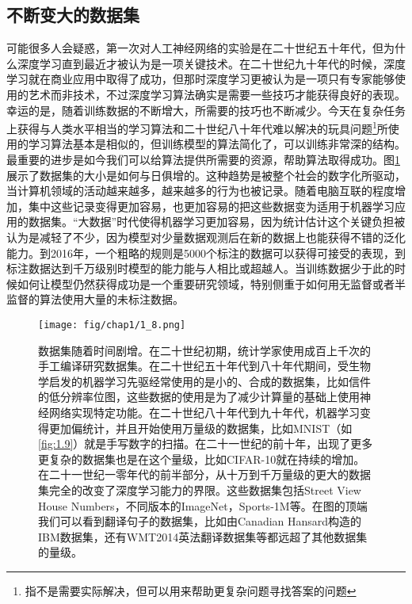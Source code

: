 \subsection{不断变大的数据集}
\label{sec:1.2.2}


可能很多人会疑惑，第一次对人工神经网络的实验是在二十世纪五十年代，但为什么深度学习直到最近才被认为是一项关键技术。在二十世纪九十年代的时候，深度学习就在商业应用中取得了成功，但那时深度学习更被认为是一项只有专家能够使用的艺术而非技术，不过深度学习算法确实是需要一些技巧才能获得良好的表现。幸运的是，随着训练数据的不断增大，所需要的技巧也不断减少。今天在复杂任务上获得与人类水平相当的学习算法和二十世纪八十年代难以解决的玩具问题\footnote{指不是需要实际解决，但可以用来帮助更复杂问题寻找答案的问题}所使用的学习算法基本是相似的，但训练模型的算法简化了，可以训练非常深的结构。最重要的进步是如今我们可以给算法提供所需要的资源，帮助算法取得成功。图\ref{fig:1.8}展示了数据集的大小是如何与日俱增的。这种趋势是被整个社会的数字化所驱动，当计算机领域的活动越来越多，越来越多的行为也被记录。随着电脑互联的程度增加，集中这些记录变得更加容易，也更加容易的把这些数据变为适用于机器学习应用的数据集。“大数据”时代使得机器学习更加容易，因为统计估计这个关键负担被认为是减轻了不少，因为模型对少量数据观测后在新的数据上也能获得不错的泛化能力。到2016年，一个粗略的规则是5000个标注的数据可以获得可接受的表现，到标注数据达到千万级别时模型的能力能与人相比或超越人。当训练数据少于此的时候如何让模型仍然获得成功是一个重要研究领域，特别侧重于如何用无监督或者半监督的算法使用大量的未标注数据。

\begin{figure}[htbp] %
   \centering
   \texttt{[image: fig/chap1/1\_8.png]} 
   \caption{数据集随着时间剧增。在二十世纪初期，统计学家使用成百上千次的手工编译研究数据集。在二十世纪五十年代到八十年代期间，受生物学启发的机器学习先驱经常使用的是小的、合成的数据集，比如信件的低分辨率位图，这些数据的使用是为了减少计算量的基础上使用神经网络实现特定功能。在二十世纪八十年代到九十年代，机器学习变得更加偏统计，并且开始使用万量级的数据集，比如MNIST（如\ref{fig:1.9}）就是手写数字的扫描。在二十一世纪的前十年，出现了更多更复杂的数据集也是在这个量级，比如CIFAR-10就在持续的增加。在二十一世纪一零年代的前半部分，从十万到千万量级的更大的数据集完全的改变了深度学习能力的界限。这些数据集包括Street View House Numbers，不同版本的ImageNet，Sports-1M等。在图的顶端我们可以看到翻译句子的数据集，比如由Canadian Hansard构造的IBM数据集，还有WMT2014英法翻译数据集等都远超了其他数据集的量级。}
   \label{fig:1.8}
\end{figure}


